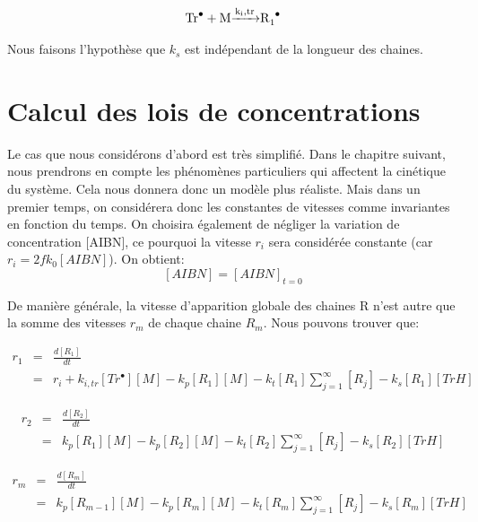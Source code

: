 \documentclass[a4paper,oneside,12pt]{article}
\begin{document}
\begin{equation}
\ce{Tr^{\bullet} + M \xrightarrow{k_i,tr} R_{1}^\bullet}
\end{equation}

Nous faisons l'hypothèse que $k_s$ est indépendant de la longueur des chaines.

\section{Calcul des lois de concentrations}
Le cas que nous considérons d'abord est très simplifié. Dans le chapitre suivant, nous prendrons en compte les phénomènes particuliers qui affectent la cinétique du système. Cela nous donnera donc un modèle plus réaliste. Mais dans un premier temps, on considérera donc les constantes de vitesses comme invariantes en fonction du temps. On choisira également de négliger la variation de concentration [AIBN], ce pourquoi la vitesse $r_i$ sera considérée constante (car $r_i=2fk_0[AIBN]$). On obtient:
$$[AIBN]=[AIBN]_{t=0}$$

De manière générale, la vitesse d'apparition globale des chaines R n'est autre que la somme des vitesses $r_{m}$ de chaque chaine $R_{m}$. Nous pouvons trouver que:

\begin{eqnarray*}
r_{1} &=& \frac{d[R_{1}]}{dt}\\
      &=& r_{i}+k_{i,tr}[Tr^{\bullet}][M]-k_p[R_{1}][M]-k_{t}[R_1]\sum\limits_{j=1}^\infty[R_j]-k_{s}[R_{1}][TrH]
\end{eqnarray*}

\begin{eqnarray*}
r_{2} &=& \frac{d[R_{2}]}{dt}\\
	&=& k_p[R_{1}][M]-k_p[R_{2}][M]-k_{t}[R_2]\sum\limits_{j=1}^\infty[R_j]-k_{s}[R_{2}][TrH]
\end{eqnarray*}

\begin{eqnarray*}
r_{m} &=& \frac{d[R_{m}]}{dt}\\
      &=& k_p[R_{m-1}][M]-k_p[R_{m}][M]-k_{t}[R_m]\sum\limits_{j=1}^\infty[R_j]-k_{s}[R_{m}][TrH]
\end{eqnarray*}
\end{document}
